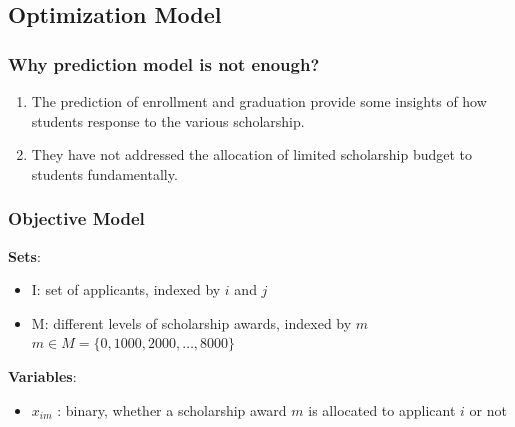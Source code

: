 \documentclass[aspectratio=169]{beamer}
\begin{document}
\subsection{Optimization Model}
\begin{frame}
\frametitle{Why prediction model is not enough?}
\begin{enumerate}
  \item The prediction of enrollment and graduation provide some 
insights of how students response to the various scholarship. 
  \item They have not addressed the allocation of limited
scholarship budget to students fundamentally.


\end{enumerate}


\end{frame}


\begin{frame}
\frametitle{Objective Model}
\textbf{Sets}:
\begin{itemize}
\item I:   set of applicants,  indexed by $i$ and $j$ \\
\item  M:  different levels of scholarship awards, indexed by 
$m$\\
$m \in  M = \{ 0,1000, 2000, \ldots ,8000\} $ \end{itemize}


\textbf{Variables}:
\begin{itemize}
\item $x_{im}$ :
binary, whether a scholarship award $m$ is allocated to applicant $i$ or not
\end{itemize}

\end{frame}
\end{document}

